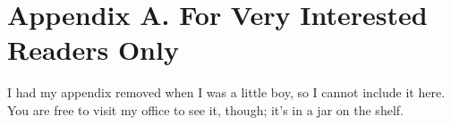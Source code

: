 \chapter*{Appendix A. For Very Interested Readers Only}

I had my appendix removed when I was a little boy, so
I cannot include it here. You are free to visit my office
to see it, though; it's in a jar on the shelf.

\endinput
